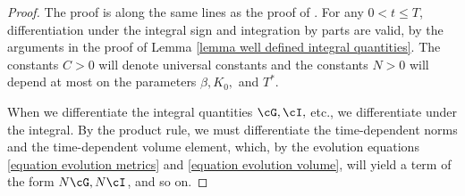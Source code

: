\documentclass[hidelinks, 12pt, oneside, reqno]{amsart}
\begin{document}
\begin{proof}
The proof is along the same lines as the proof of \cite[Proposition 7]{kotschwarEnergy}. For any $0<t\le T$, differentiation under the integral sign and integration by parts are valid, by the arguments in the proof of Lemma \ref{lemma well defined integral quantities}. The constants $C >0$ will denote universal constants and the constants $N > 0$ will depend at most on the parameters $\beta, K_0,$ and $T^*$.

When we differentiate the integral quantities $\cG, \cI,$ etc., we differentiate under the integral.  By the product rule, we must differentiate the time-dependent norms and the time-dependent volume element, which, by the evolution equations \eqref{equation evolution metrics} and \eqref{equation evolution volume}, will yield a term of the form $N\cG, N\cI$, and so on. 


\end{proof}
\end{document}

